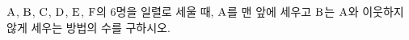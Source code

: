 $\mathrm{A}$, $\mathrm{B}$, $\mathrm{C}$, $\mathrm{D}$, $\mathrm{E}$, $\mathrm{F}$의 $6$명을 일렬로 세울 때, $\mathrm{A}$를 맨 앞에 세우고 $\mathrm{B}$는 $\mathrm{A}$와 이웃하지 않게 세우는 방법의 수를 구하시오.
